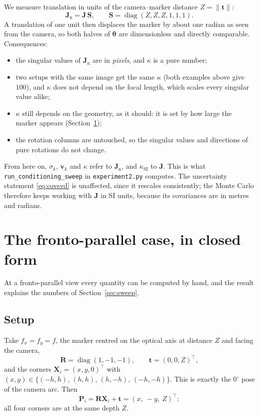 \documentclass[11pt,a4paper]{article}
\theoremstyle{remark}
\newcommand{\Rmat}{\mathbf{R}}
\newcommand{\Jmat}{\mathbf{J}}
\newcommand{\Smat}{\mathbf{S}}
\newcommand{\Pvec}{\mathbf{P}}
\newcommand{\tvec}{\mathbf{t}}
\newcommand{\vvec}{\mathbf{v}}
\newcommand{\Xvec}{\mathbf{X}}
\newcommand{\thetavec}{\boldsymbol{\theta}}
\begin{document}
We measure translation in units of the camera--marker distance
$Z = \|\tvec\|$:
\begin{equation}
  \Jmat_{\mathrm{n}} = \Jmat\,\Smat,
  \qquad
  \Smat = \operatorname{diag}(Z,Z,Z,1,1,1).
  \label{eq:Jn}
\end{equation}
A translation of one unit then displaces the marker by about one radian as seen
from the camera, so both halves of $\thetavec$ are dimensionless and directly
comparable. Consequences:
\begin{itemize}[leftmargin=*]
  \item the singular values of $\Jmat_{\mathrm{n}}$ are in \emph{pixels}, and
        $\kappa$ is a pure number;
  \item two setups with the same image get the same $\kappa$ (both examples
        above give $100$), and $\kappa$ does not depend on the focal length,
        which scales every singular value alike;
  \item $\kappa$ still depends on the geometry, as it should: it is set by how
        large the marker appears (Section~\ref{sec:frontal});
  \item the rotation columns are untouched, so the singular values and
        directions of pure rotations do not change.
\end{itemize}
From here on, $\sigma_k$, $\vvec_k$ and $\kappa$ refer to $\Jmat_{\mathrm{n}}$,
and $\kappa_{\mathrm{SI}}$ to $\Jmat$. This is what
\texttt{run\_conditioning\_sweep} in \texttt{experiment2.py} computes. The
uncertainty statement \eqref{eq:covsvd} is unaffected, since it rescales
consistently; the Monte Carlo therefore keeps working with $\Jmat$ in SI units,
because its covariances are in metres and radians.

\section{The fronto-parallel case, in closed form}
\label{sec:frontal}

At a fronto-parallel view every quantity can be computed by hand, and the
result explains the numbers of Section~\ref{sec:sweep}.

\subsection{Setup}

Take $f_x = f_y = f$, the marker centred on the optical axis at distance $Z$ and
facing the camera,
\begin{equation}
  \Rmat = \operatorname{diag}(1,-1,-1),
  \qquad
  \tvec = (0,0,Z)^{\top},
\end{equation}
and the corners $\Xvec_i = (x,y,0)^{\top}$ with
$(x,y) \in \{(-h,h),\,(h,h),\,(h,-h),\,(-h,-h)\}$. This is exactly the
$0^{\circ}$ pose of the camera arc. Then
\begin{equation}
  \Pvec_i = \Rmat\Xvec_i + \tvec = (x,\ -y,\ Z)^{\top}:
\end{equation}
all four corners are at the same depth $Z$.
\end{document}
